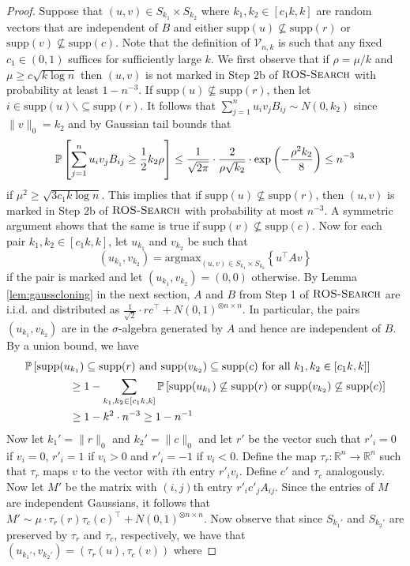 \begin{proof}
Suppose that $(u, v) \in S_{k_1} \times S_{k_2}$ where $k_1, k_2 \in [c_1 k, k]$ are random vectors that are independent of $B$ and either $\text{supp}(u) \not \subseteq \text{supp}(r)$ or $\text{supp}(v) \not \subseteq \text{supp}(c)$. Note that the definition of $\mathcal{V}_{n, k}$ is such that any fixed $c_1 \in (0, 1)$ suffices for sufficiently large $k$. We first observe that if $\rho = \mu/k$ and $\mu \ge c \sqrt{k \log n}$ then $(u, v)$ is not marked in Step 2b of $\textsc{ROS-Search}$ with probability at least $1 - n^{-3}$. If $\text{supp}(u) \not \subseteq \text{supp}(r)$, then let $i \in \text{supp}(u) \backslash \subseteq \text{supp}(r)$. It follows that $\sum_{j = 1}^n u_i v_j B_{ij} \sim N(0, k_2)$ since $\| v \|_0 = k_2$ and by Gaussian tail bounds that
$$\mathbb{P}\left[ \sum_{j = 1}^n u_i v_j B_{ij} \ge \frac{1}{2} k_2 \rho \right] \le \frac{1}{\sqrt{2\pi}} \cdot \frac{2}{\rho \sqrt{k_2}} \cdot \exp\left(- \frac{\rho^2 k_2}{8} \right) \le n^{-3}$$
if $\mu^2 \ge \sqrt{3c_1 k \log n}$. This implies that if $\text{supp}(u) \not \subseteq \text{supp}(r)$, then $(u, v)$ is marked in Step 2b of $\textsc{ROS-Search}$ with probability at most $n^{-3}$. A symmetric argument shows that the same is true if $\text{supp}(v) \not \subseteq \text{supp}(c)$. Now for each pair $k_1, k_2 \in [c_1 k, k]$, let $u_{k_1}$ and $v_{k_2}$ be such that
$$(u_{k_1}, v_{k_2}) = \text{argmax}_{(u, v) \in S_{k_1} \times S_{k_2}} \left\{ u^\top A v \right\}$$
if the pair is marked and let $(u_{k_1}, v_{k_2}) = (0, 0)$ otherwise. By Lemma \ref{lem:gausscloning} in the next section, $A$ and $B$ from Step 1 of $\textsc{ROS-Search}$ are i.i.d. and distributed as $\frac{1}{\sqrt{2}} \cdot rc^\top + N(0, 1)^{\otimes n \times n}$. In particular, the pairs $(u_{k_1}, v_{k_2})$ are in the $\sigma$-algebra generated by $A$ and hence are independent of $B$. By a union bound, we have
\begin{align*}
&\mathbb{P}\left[ \text{supp}(u_{k_1}) \subseteq \text{supp}(r) \text{ and } \text{supp}(v_{k_2}) \subseteq \text{supp}(c) \text{ for all } k_1, k_2 \in [c_1 k, k] \right] \\
&\quad \quad \quad \quad \ge 1 - \sum_{k_1, k_2 \in [c_1 k, k]} \mathbb{P}\left[ \text{supp}(u_{k_1}) \not \subseteq \text{supp}(r) \text{ or } \text{supp}(v_{k_2}) \not \subseteq \text{supp}(c) \right] \\
&\quad \quad \quad \quad \ge 1 - k^2 \cdot n^{-3} \ge 1 - n^{-1}
\end{align*}
Now let $k_1' = \| r \|_0$ and $k_2' = \| c \|_0$ and let $r'$ be the vector such that $r'_i = 0$ if $v_i = 0$, $r'_i = 1$ if $v_i > 0$ and $r'_i = -1$ if $v_i < 0$. Define the map $\tau_r : \mathbb{R}^n \to \mathbb{R}^n$ such that $\tau_r$ maps $v$ to the vector with $i$th entry $r'_i v_i$. Define $c'$ and $\tau_c$ analogously. Now let $M'$ be the matrix with $(i, j)$th entry $r'_i c'_j A_{ij}$. Since the entries of $M$ are independent Gaussians, it follows that $M' \sim \mu \cdot \tau_r(r) \tau_c(c)^\top + N(0, 1)^{\otimes n \times n}$. Now observe that since $S_{k_1'}$ and $S_{k_2'}$ are preserved by $\tau_r$ and $\tau_c$, respectively, we have that $(u_{k_1'}, v_{k_2'}) = (\tau_r(u), \tau_c(v))$ where

\end{proof}
